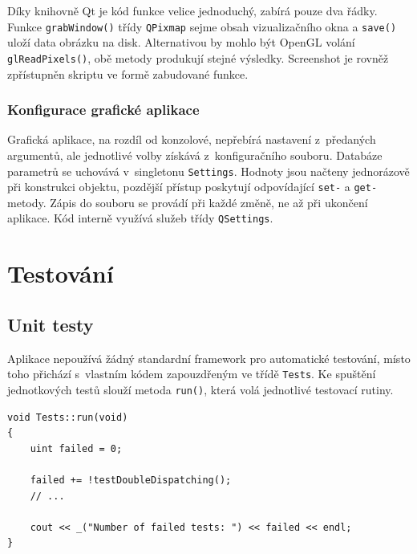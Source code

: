 \documentclass[11pt,twoside,a4paper]{book}
\begin{document}
Díky knihovně Qt je kód funkce velice jednoduchý, zabírá pouze dva řádky. Funkce \texttt{grab\-Win\-dow()} třídy \texttt{QPixmap} sejme obsah vizualizačního okna a \texttt{save()} uloží data obrázku na disk. Alternativou by mohlo být OpenGL volání \texttt{glReadPixels()}, obě metody produkují stejné výsledky. Screenshot je rovněž zpřístupněn skriptu ve formě zabudované funkce.


\subsection{Konfigurace grafické aplikace}

Grafická aplikace, na rozdíl od konzolové, nepřebírá nastavení z~předaných argumentů, ale jednotlivé volby získává z~konfiguračního souboru. Databáze parametrů se uchovává v~singletonu \texttt{Settings}. Hodnoty jsou načteny jednorázově při konstrukci objektu, pozdější přístup poskytují odpovídající \texttt{set-} a \texttt{get-} metody. Zápis do souboru se provádí při každé změně, ne až při ukončení aplikace. Kód interně využívá služeb třídy \texttt{QSettings}.




\chapter{Testování}


\section{Unit testy}
\label{unit_testy}

Aplikace nepoužívá žádný standardní framework pro automatické testování, místo toho při\-chá\-zí s~vlastním kódem zapouzdřeným ve třídě \texttt{Tests}. Ke spuštění jednotkových testů slouží metoda \texttt{run()}, která volá jednotlivé testovací rutiny.

\begin{verbatim}
void Tests::run(void)
{
    uint failed = 0;

    failed += !testDoubleDispatching();
    // ...

    cout << _("Number of failed tests: ") << failed << endl;
}
\end{verbatim}
\end{document}
